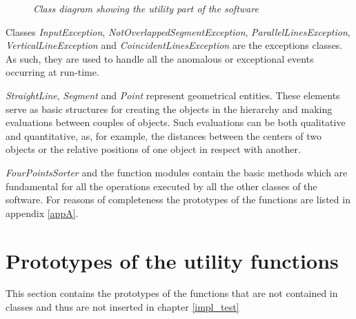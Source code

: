 		\begin{figure}[h]
		  \begin{center} 
		  \end{center} 
		  \caption{\textit{Class diagram showing the utility part of the software}}  
		  \label{fig:impl_utility}
	 	\end{figure}

		Classes \emph{InputException}, \emph{NotOverlappedSegmentException}, \emph{ParallelLinesException}, \emph{VerticalLineException} and \emph{CoincidentLinesException} are the exceptions classes. 
		As such, they are used to handle all the anomalous or exceptional events occurring at run-time.	
	
		\emph{StraightLine}, \emph{Segment} and \emph{Point} represent geometrical entities. These elements serve as basic structures for creating the objects in the hierarchy and making evaluations between couples of objects.
		Such evaluations can be both qualitative and quantitative, as, for example, the distances between the centers of two objects or the relative positions of one object in respect with another.
		
		\emph{FourPointsSorter} and the function modules contain the basic methods which are fundamental for all the operations executed by all the other classes of the software.
		For reasons of completeness the prototypes of the functions are listed in appendix \ref{appA}.



	\section{Prototypes of the utility functions}
	This section contains the prototypes of the functions that are not contained in classes and thus are not inserted in chapter \ref{impl_test}
	

